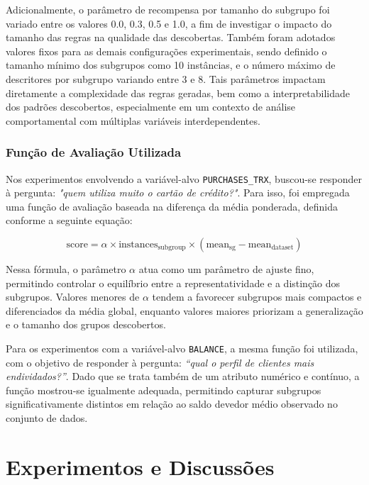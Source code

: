 \documentclass[12pt]{article}
\begin{document}
Adicionalmente, o parâmetro de recompensa por tamanho do subgrupo foi variado entre os valores 0.0, 0.3, 0.5 e 1.0, a fim de investigar o impacto do tamanho das regras na qualidade das descobertas. Também foram adotados valores fixos para as demais configurações experimentais, sendo definido o tamanho mínimo dos subgrupos como 10 instâncias, e o número máximo de descritores por subgrupo variando entre 3 e 8. Tais parâmetros impactam diretamente a complexidade das regras geradas, bem como a interpretabilidade dos padrões descobertos, especialmente em um contexto de análise comportamental com múltiplas variáveis interdependentes.

\subsubsection{Função de Avaliação Utilizada}

Nos experimentos envolvendo a variável-alvo \texttt{PURCHASES\_TRX}, buscou-se responder à pergunta: \textit{"quem utiliza muito o cartão de crédito?"}. Para isso, foi empregada uma função de avaliação baseada na diferença da média ponderada, definida conforme a seguinte equação:

\begin{equation}
    \text{score} = \alpha \times \text{instances}_{\text{subgroup}} \times (\text{mean}_{\text{sg}} - \text{mean}_{\text{dataset}})
\end{equation}

Nessa fórmula, o parâmetro $\alpha$ atua como um parâmetro de ajuste fino, permitindo controlar o equilíbrio entre a representatividade e a distinção dos subgrupos. Valores menores de $\alpha$ tendem a favorecer subgrupos mais compactos e diferenciados da média global, enquanto valores maiores priorizam a generalização e o tamanho dos grupos descobertos.

Para os experimentos com a variável-alvo \texttt{BALANCE}, a mesma função foi utilizada, com o objetivo de responder à pergunta: \textit{“qual o perfil de clientes mais endividados?”}. Dado que se trata também de um atributo numérico e contínuo, a função mostrou-se igualmente adequada, permitindo capturar subgrupos significativamente distintos em relação ao saldo devedor médio observado no conjunto de dados.

\section{Experimentos e Discussões}
\end{document}
